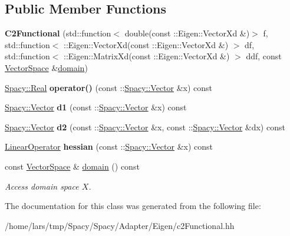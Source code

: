 \subsection*{Public Member Functions}
\begin{DoxyCompactItemize}
\item 
{\bfseries C2\+Functional} (std\+::function$<$ double(const \+::Eigen\+::\+Vector\+Xd \&)$>$ f, std\+::function$<$ \+::Eigen\+::\+Vector\+Xd(const \+::Eigen\+::\+Vector\+Xd \&) $>$ df, std\+::function$<$ \+::Eigen\+::\+Matrix\+Xd(const \+::Eigen\+::\+Vector\+Xd \&) $>$ ddf, const \hyperlink{classSpacy_1_1VectorSpace}{Vector\+Space} \&\hyperlink{classSpacy_1_1FunctionalBase_a2d3397deb9fa1ad85ed04e37a03b3aa6}{domain})\hypertarget{classSpacy_1_1Rn_1_1C2Functional_a6d17f9e30a1c0fb522a0a135de96f72a}{}\label{classSpacy_1_1Rn_1_1C2Functional_a6d17f9e30a1c0fb522a0a135de96f72a}

\item 
\hyperlink{classSpacy_1_1Real}{Spacy\+::\+Real} {\bfseries operator()} (const \+::\hyperlink{classSpacy_1_1Vector}{Spacy\+::\+Vector} \&x) const \hypertarget{classSpacy_1_1Rn_1_1C2Functional_ad69e7f55b9647b34f6e132e7c831c46f}{}\label{classSpacy_1_1Rn_1_1C2Functional_ad69e7f55b9647b34f6e132e7c831c46f}

\item 
\hyperlink{classSpacy_1_1Vector}{Spacy\+::\+Vector} {\bfseries d1} (const \+::\hyperlink{classSpacy_1_1Vector}{Spacy\+::\+Vector} \&x) const \hypertarget{classSpacy_1_1Rn_1_1C2Functional_a5bfa18cf358557d1d1cc3d2a76022660}{}\label{classSpacy_1_1Rn_1_1C2Functional_a5bfa18cf358557d1d1cc3d2a76022660}

\item 
\hyperlink{classSpacy_1_1Vector}{Spacy\+::\+Vector} {\bfseries d2} (const \+::\hyperlink{classSpacy_1_1Vector}{Spacy\+::\+Vector} \&x, const \+::\hyperlink{classSpacy_1_1Vector}{Spacy\+::\+Vector} \&dx) const \hypertarget{classSpacy_1_1Rn_1_1C2Functional_a4ebc4d850e0c11707a9d4c14f085e920}{}\label{classSpacy_1_1Rn_1_1C2Functional_a4ebc4d850e0c11707a9d4c14f085e920}

\item 
\hyperlink{classSpacy_1_1Rn_1_1LinearOperator}{Linear\+Operator} {\bfseries hessian} (const \+::\hyperlink{classSpacy_1_1Vector}{Spacy\+::\+Vector} \&x) const \hypertarget{classSpacy_1_1Rn_1_1C2Functional_a81b74f77f5680529d82cebde572643e4}{}\label{classSpacy_1_1Rn_1_1C2Functional_a81b74f77f5680529d82cebde572643e4}

\item 
const \hyperlink{classSpacy_1_1VectorSpace}{Vector\+Space} \& \hyperlink{classSpacy_1_1FunctionalBase_a2d3397deb9fa1ad85ed04e37a03b3aa6}{domain} () const \hypertarget{classSpacy_1_1FunctionalBase_a2d3397deb9fa1ad85ed04e37a03b3aa6}{}\label{classSpacy_1_1FunctionalBase_a2d3397deb9fa1ad85ed04e37a03b3aa6}

\begin{DoxyCompactList}\small\item\em Access domain space $X$. \end{DoxyCompactList}\end{DoxyCompactItemize}


The documentation for this class was generated from the following file\+:\begin{DoxyCompactItemize}
\item 
/home/lars/tmp/\+Spacy/\+Spacy/\+Adapter/\+Eigen/c2\+Functional.\+hh\end{DoxyCompactItemize}
